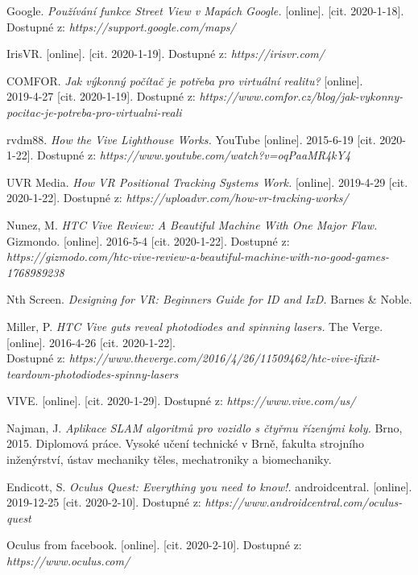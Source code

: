 \documentclass[a4paper, 12pt]{report}
\begin{document}
\begin{thebibliography}{9}
 Google. \textit{Používání funkce Street View v Mapách Google.} [online]. [cit. 2020-1-18]. Dostupné z: \textit{https://support.google.com/maps/}

 IrisVR. [online]. [cit. 2020-1-19]. Dostupné z: \textit{https://irisvr.com/}

 COMFOR. \textit{Jak výkonný počítač je potřeba pro virtuální realitu?} [online].\\ 2019-4-27 [cit. 2020-1-19]. Dostupné z: \textit{https://www.comfor.cz/blog/jak-vykonny-pocitac-je-potreba-pro-virtualni-reali}

 rvdm88. \textit{How the Vive Lighthouse Works.} YouTube [online]. 2015-6-19 [cit. 2020-1-22]. Dostupné z: \textit{https://www.youtube.com/watch?v=oqPaaMR4kY4}

 UVR Media. \textit{How VR Positional Tracking Systems Work.} [online]. 2019-4-29 [cit. 2020-1-22]. Dostupné z: \textit{https://uploadvr.com/how-vr-tracking-works/}

 Nunez, M. \textit{HTC Vive Review: A Beautiful Machine With One Major Flaw.} Gizmondo. [online]. 2016-5-4 [cit. 2020-1-22]. Dostupné z: \textit{https://gizmodo.com/htc-vive-review-a-beautiful-machine-with-no-good-games-1768989238}

 Nth Screen. \textit{Designing for VR: Beginners Guide for ID and IxD.} Barnes \& Noble.

 Miller, P. \textit{HTC Vive guts reveal photodiodes and spinning lasers.} The Verge. [online]. 2016-4-26 [cit. 2020-1-22]. \\Dostupné z: \textit{https://www.theverge.com/2016/4/26/11509462/htc-vive-ifixit-teardown-photodiodes-spinny-lasers}

 VIVE. [online]. [cit. 2020-1-29]. Dostupné z: \textit{https://www.vive.com/us/}

 Najman, J. \textit{Aplikace SLAM algoritmů pro vozidlo s čtyřmu řízenými koly.} Brno, 2015. Diplomová práce. Vysoké učení technické v Brně, fakulta strojního inženýrství, ústav mechaniky těles, mechatroniky a biomechaniky.

 Endicott, S. \textit{Oculus Quest: Everything you need to know!.} androidcentral. [online]. 2019-12-25 [cit. 2020-2-10]. Dostupné z: \textit{https://www.androidcentral.com/oculus-quest}

 Oculus from facebook. [online]. [cit. 2020-2-10]. Dostupné z: \textit{https://www.oculus.com/}


\end{thebibliography}
\end{document}
